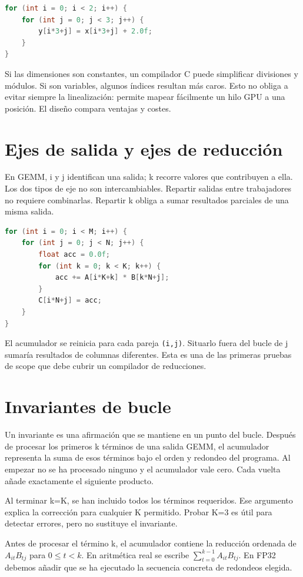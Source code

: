 \documentclass[12pt,a4paper,oneside]{report}
\begin{document}
\begin{lstlisting}[language=C]
for (int i = 0; i < 2; i++) {
    for (int j = 0; j < 3; j++) {
        y[i*3+j] = x[i*3+j] + 2.0f;
    }
}
\end{lstlisting}
Si las dimensiones son constantes, un compilador C puede simplificar divisiones y módulos. Si son variables, algunos índices resultan más caros. Esto no obliga a evitar siempre la linealización: permite mapear fácilmente un hilo GPU a una posición. El diseño compara ventajas y costes.

\section{Ejes de salida y ejes de reducción}
En GEMM, i y j identifican una salida; k recorre valores que contribuyen a ella. Los dos tipos de eje no son intercambiables. Repartir salidas entre trabajadores no requiere combinarlas. Repartir k obliga a sumar resultados parciales de una misma salida.

\begin{lstlisting}[language=C]
for (int i = 0; i < M; i++) {
    for (int j = 0; j < N; j++) {
        float acc = 0.0f;
        for (int k = 0; k < K; k++) {
            acc += A[i*K+k] * B[k*N+j];
        }
        C[i*N+j] = acc;
    }
}
\end{lstlisting}
El acumulador se reinicia para cada pareja \texttt{(i,j)}. Situarlo fuera del bucle de j sumaría resultados de columnas diferentes. Esta es una de las primeras pruebas de scope que debe cubrir un compilador de reducciones.

\section{Invariantes de bucle}
Un invariante es una afirmación que se mantiene en un punto del bucle. Después de procesar los primeros k términos de una salida GEMM, el acumulador representa la suma de esos términos bajo el orden y redondeo del programa. Al empezar no se ha procesado ninguno y el acumulador vale cero. Cada vuelta añade exactamente el siguiente producto.

Al terminar k=K, se han incluido todos los términos requeridos. Ese argumento explica la corrección para cualquier K permitido. Probar K=3 es útil para detectar errores, pero no sustituye el invariante.

\begin{traduccion}
Antes de procesar el término k, el acumulador contiene la reducción ordenada de $A_{it}B_{tj}$ para $0\leq t<k$. En aritmética real se escribe $\sum_{t=0}^{k-1}A_{it}B_{tj}$. En FP32 debemos añadir que se ha ejecutado la secuencia concreta de redondeos elegida.

\end{traduccion}
\end{document}
